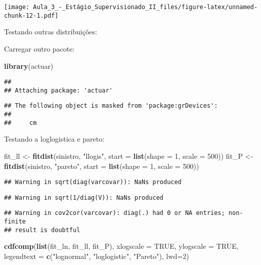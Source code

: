 \documentclass[]{article}
\newenvironment{Shaded}{\begin{snugshade}}{\end{snugshade}}
\newcommand{\DataTypeTok}[1]{\textcolor[rgb]{0.13,0.29,0.53}{#1}}
\newcommand{\DecValTok}[1]{\textcolor[rgb]{0.00,0.00,0.81}{#1}}
\newcommand{\KeywordTok}[1]{\textcolor[rgb]{0.13,0.29,0.53}{\textbf{#1}}}
\newcommand{\NormalTok}[1]{#1}
\newcommand{\OtherTok}[1]{\textcolor[rgb]{0.56,0.35,0.01}{#1}}
\newcommand{\StringTok}[1]{\textcolor[rgb]{0.31,0.60,0.02}{#1}}
\begin{document}
\texttt{[image: Aula\_3\_-\_Estágio\_Supervisionado\_II\_files/figure-latex/unnamed-chunk-12-1.pdf]}

Testando outras distribuições:

Carregar outro pacote:

\begin{Shaded}
\begin{Highlighting}[]
\KeywordTok{library}\NormalTok{(actuar)}
\end{Highlighting}
\end{Shaded}

\begin{verbatim}
## 
## Attaching package: 'actuar'
\end{verbatim}

\begin{verbatim}
## The following object is masked from 'package:grDevices':
## 
##     cm
\end{verbatim}

Testando a loglogistica e pareto:

\begin{Shaded}
\begin{Highlighting}[]
\NormalTok{fit_ll <-}\StringTok{ }\KeywordTok{fitdist}\NormalTok{(sinistro, }\StringTok{"llogis"}\NormalTok{, }\DataTypeTok{start =} \KeywordTok{list}\NormalTok{(}\DataTypeTok{shape =} \DecValTok{1}\NormalTok{, }\DataTypeTok{scale =} \DecValTok{500}\NormalTok{))}
\NormalTok{fit_P  <-}\StringTok{ }\KeywordTok{fitdist}\NormalTok{(sinistro, }\StringTok{"pareto"}\NormalTok{, }\DataTypeTok{start =} \KeywordTok{list}\NormalTok{(}\DataTypeTok{shape =} \DecValTok{1}\NormalTok{, }\DataTypeTok{scale =} \DecValTok{500}\NormalTok{))}
\end{Highlighting}
\end{Shaded}

\begin{verbatim}
## Warning in sqrt(diag(varcovar)): NaNs produced
\end{verbatim}

\begin{verbatim}
## Warning in sqrt(1/diag(V)): NaNs produced
\end{verbatim}

\begin{verbatim}
## Warning in cov2cor(varcovar): diag(.) had 0 or NA entries; non-finite
## result is doubtful
\end{verbatim}

\begin{Shaded}
\begin{Highlighting}[]
\KeywordTok{cdfcomp}\NormalTok{(}\KeywordTok{list}\NormalTok{(fit_ln, fit_ll, fit_P), }\DataTypeTok{xlogscale =} \OtherTok{TRUE}\NormalTok{, }\DataTypeTok{ylogscale =} \OtherTok{TRUE}\NormalTok{,}
        \DataTypeTok{legendtext =} \KeywordTok{c}\NormalTok{(}\StringTok{"lognormal"}\NormalTok{, }\StringTok{"loglogistic"}\NormalTok{, }\StringTok{"Pareto"}\NormalTok{), }\DataTypeTok{lwd=}\DecValTok{2}\NormalTok{)}
\end{Highlighting}
\end{Shaded}
\end{document}
